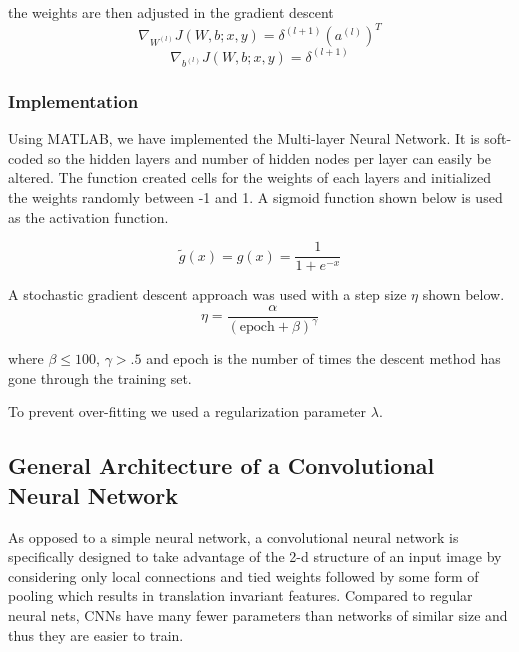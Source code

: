 \documentclass[12pt, twocolumn]{article}
\begin{document}
the weights are then adjusted in the gradient descent
\begin{equation}
\nabla_{W^{(l)}}J(W,b;x,y) = \delta^{(l+1)}(a^{(l)})^T
\end{equation}
\begin{equation}
\nabla_{b^{(l)}}J(W,b;x,y)= \delta^{(l+1)}
\end{equation}


\subsubsection{Implementation}
Using MATLAB, we have implemented the Multi-layer Neural Network. It is soft-coded so the hidden layers and number of hidden nodes per layer can easily be altered. The function created cells for the weights of each layers and initialized the weights randomly between -1 and 1.
\newline
A sigmoid function shown below is used as the activation function.

\begin{equation}
\tilde{g}(x)= g(x) = \frac{1}{ 1+e^{-x}}
\end{equation}

A stochastic gradient descent approach was used with a step size $\eta$ shown below.
\begin{equation}
\eta = \frac{ \alpha}{ (\textrm{epoch} + \beta)^\gamma}
\end{equation}

where $\beta \leq 100$, $\gamma >.5$ and epoch is the number of times the descent method has gone through the training set.  
\newline\newline

To prevent over-fitting we used a regularization parameter $\lambda$. 


\subsection{General Architecture of a Convolutional Neural Network}
As opposed to a simple neural network, a convolutional neural network is specifically designed to take advantage of the 2-d structure of an input image by considering only local connections and tied weights followed by some form of pooling which results in translation invariant features. Compared to regular neural nets,  CNNs  have many fewer parameters than networks of similar size and thus they are easier to train. 
\end{document}

